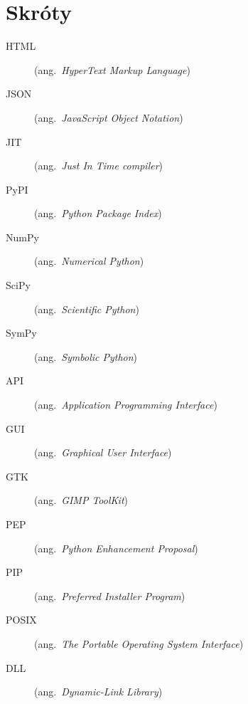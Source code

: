 \chapter*{Skróty}\mbox{}
\label{sec:skroty}
\noindent
\begin{description}
  \item [HTML]    (ang.\ \emph{HyperText Markup Language})
  \item [JSON]    (ang.\ \emph{JavaScript Object Notation})
  \item [JIT]     (ang.\ \emph{Just In Time compiler})
  \item [PyPI]    (ang.\ \emph{Python Package Index})
  \item [NumPy]   (ang.\ \emph{Numerical Python})
  \item [SciPy]   (ang.\ \emph{Scientific Python})
  \item [SymPy]   (ang.\ \emph{Symbolic Python})
  \item [API]     (ang.\ \emph{Application Programming Interface})
  \item [GUI]     (ang.\ \emph{Graphical User Interface})
  \item [GTK]     (ang.\ \emph{GIMP ToolKit})
  \item [PEP]     (ang.\ \emph{Python Enhancement Proposal})
  \item [PIP]     (ang.\ \emph{Preferred Installer Program})
  \item [POSIX]   (ang.\ \emph{The Portable Operating System Interface})
  \item [DLL]     (ang.\ \emph{Dynamic-Link Library})
\end{description}
